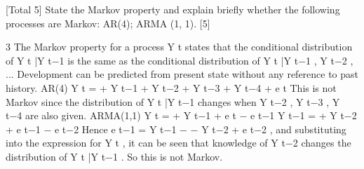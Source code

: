 \documentclass[a4paper,12pt]{article}
\begin{document}
 


[Total 5]
State the Markov property and explain briefly whether the following processes are
Markov:
AR(4);
ARMA (1, 1).
[5]


3
The Markov property for a process {Y t } states that the conditional distribution of
Y t |Y t−1 is the same as the conditional distribution of
Y t |Y t−1 , Y t−2 , ...
Development can be predicted from present state without any reference to past
history.
AR(4)
Y t = \alpha  +  Y t−1 +  Y t−2 +  Y t−3 +  Y t−4 + e t
This is not Markov since the distribution of Y t |Y t−1 changes when Y t−2 , Y t−3 , Y t−4 are
also given.
ARMA(1,1)
Y t = \alpha  + \beta Y t−1 + e t − \theta e t−1
Y t−1 = \alpha  + \beta Y t−2 + e t−1 − \theta e t−2
Hence e t−1 = Y t−1 − \alpha  − \beta Y t−2 + \theta e t−2 , and substituting into the expression for Y t , it
can be seen that knowledge of Y t−2 changes the distribution of Y t |Y t−1 . So this is not
Markov.
\end{document}
